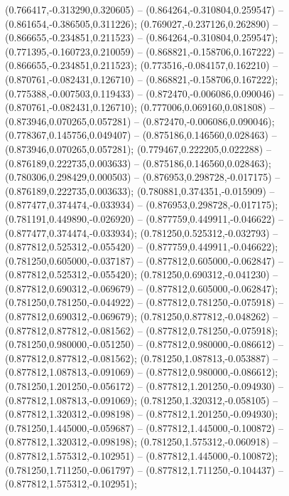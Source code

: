  (0.766417,-0.313290,0.320605) -- (0.864264,-0.310804,0.259547) -- (0.861654,-0.386505,0.311226);
 (0.769027,-0.237126,0.262890) -- (0.866655,-0.234851,0.211523) -- (0.864264,-0.310804,0.259547);
 (0.771395,-0.160723,0.210059) -- (0.868821,-0.158706,0.167222) -- (0.866655,-0.234851,0.211523);
 (0.773516,-0.084157,0.162210) -- (0.870761,-0.082431,0.126710) -- (0.868821,-0.158706,0.167222);
 (0.775388,-0.007503,0.119433) -- (0.872470,-0.006086,0.090046) -- (0.870761,-0.082431,0.126710);
 (0.777006,0.069160,0.081808) -- (0.873946,0.070265,0.057281) -- (0.872470,-0.006086,0.090046);
 (0.778367,0.145756,0.049407) -- (0.875186,0.146560,0.028463) -- (0.873946,0.070265,0.057281);
 (0.779467,0.222205,0.022288) -- (0.876189,0.222735,0.003633) -- (0.875186,0.146560,0.028463);
 (0.780306,0.298429,0.000503) -- (0.876953,0.298728,-0.017175) -- (0.876189,0.222735,0.003633);
 (0.780881,0.374351,-0.015909) -- (0.877477,0.374474,-0.033934) -- (0.876953,0.298728,-0.017175);
 (0.781191,0.449890,-0.026920) -- (0.877759,0.449911,-0.046622) -- (0.877477,0.374474,-0.033934);
 (0.781250,0.525312,-0.032793) -- (0.877812,0.525312,-0.055420) -- (0.877759,0.449911,-0.046622);
 (0.781250,0.605000,-0.037187) -- (0.877812,0.605000,-0.062847) -- (0.877812,0.525312,-0.055420);
 (0.781250,0.690312,-0.041230) -- (0.877812,0.690312,-0.069679) -- (0.877812,0.605000,-0.062847);
 (0.781250,0.781250,-0.044922) -- (0.877812,0.781250,-0.075918) -- (0.877812,0.690312,-0.069679);
 (0.781250,0.877812,-0.048262) -- (0.877812,0.877812,-0.081562) -- (0.877812,0.781250,-0.075918);
 (0.781250,0.980000,-0.051250) -- (0.877812,0.980000,-0.086612) -- (0.877812,0.877812,-0.081562);
 (0.781250,1.087813,-0.053887) -- (0.877812,1.087813,-0.091069) -- (0.877812,0.980000,-0.086612);
 (0.781250,1.201250,-0.056172) -- (0.877812,1.201250,-0.094930) -- (0.877812,1.087813,-0.091069);
 (0.781250,1.320312,-0.058105) -- (0.877812,1.320312,-0.098198) -- (0.877812,1.201250,-0.094930);
 (0.781250,1.445000,-0.059687) -- (0.877812,1.445000,-0.100872) -- (0.877812,1.320312,-0.098198);
 (0.781250,1.575312,-0.060918) -- (0.877812,1.575312,-0.102951) -- (0.877812,1.445000,-0.100872);
 (0.781250,1.711250,-0.061797) -- (0.877812,1.711250,-0.104437) -- (0.877812,1.575312,-0.102951);

